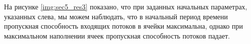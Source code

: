 
На рисунке \ref{img:sec5_res3} показано, что при заданных начальных параметрах, указанных слева, мы можем наблюдать, что в начальный период времени пропускная способность входящих потоков в ячейки максимальна, однако при максимальном наполнении ячеек пропускная способность потоков падает.


\clearpage